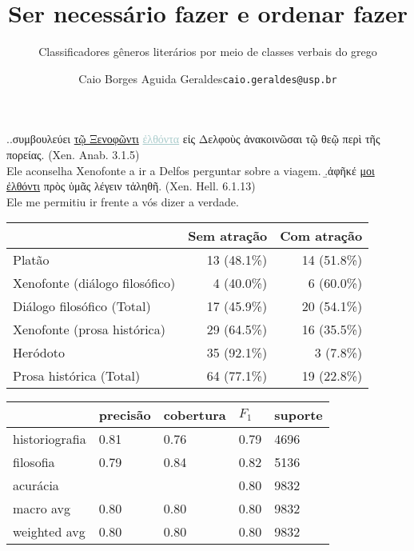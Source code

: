 \documentclass[10pt]{beamer}
\title{Ser necessário fazer e ordenar fazer}
\subtitle{Classificadores gêneros literários por meio de classes verbais do grego}
\author{Caio Borges Aguida Geraldes\newline \texttt{caio.geraldes@usp.br}\vspace{5pt}}
\institute{FFLCH-USP\\\texttt{[image: logo-fapesp.png]}}
\newcommand{\Vum}[1]{#1}
\newcommand{\Vdois}[1]{#1}
\newcommand{\Obl}[1]{\textcolor{obl}{\uline{#1}}}
\newcommand{\XAcu}[1]{\textcolor{acc}{\uline{#1}}}
\newcommand{\XObl}[1]{\textcolor{atr}{\uline{#1}}}
\begin{document}
\maketitle

\begin{frame}
	\ex.\a.\Vum{συμβουλεύει} \Obl{τῷ Ξενοφῶντι} \XAcu{ἐλθόντα} {εἰς Δελφοὺς} \Vdois{ἀνακοινῶσαι} {τῷ θεῷ} {περὶ τῆς πορείας}. (Xen. Anab. 3.1.5)\vspace{5pt}\\
	Ele aconselha Xenofonte a ir a Delfos perguntar sobre a viagem.\vspace{10pt}
	\b.ἀφῆκέ \Obl{μοι} \XObl{ἐλθόντι} πρὸς ὑμᾶς λέγειν τἀληθῆ. (Xen. Hell. 6.1.13)\vspace{5pt}\\
	Ele me permitiu ir frente a vós dizer a verdade.


\end{frame}

\begin{frame}
	\begin{table}[!h]
		\begin{center}
			\begin{tabular}[t]{lrr}
				\toprule
				                               & Sem atração  & Com atração  \\
				\midrule
				Platão                         & 13 (48.1\%)  & 14 (51.8\%)  \\
				Xenofonte (diálogo filosófico) & 4   (40.0\%) & 6 (60.0\%)   \\
				\midrule
				Diálogo filosófico (Total)     & 17 (45.9\%)  & 20  (54.1\%) \\
				\midrule
				\midrule
				Xenofonte (prosa histórica)    & 29 (64.5\%)  & 16  (35.5\%) \\
				Heródoto                       & 35 (92.1\%)  & 3   (7.8\%)  \\
				\midrule
				Prosa histórica (Total)        & 64 (77.1\%)  & 19  (22.8\%) \\
				\bottomrule
			\end{tabular}
		\end{center}
	\end{table}
\end{frame}

\begin{frame}
	\begin{table}[!ht]
		\centering
		\begin{tabular}{lllll}
			\toprule
			{}             & precisão & cobertura & $F_1$ & suporte \\
			\midrule
			historiografia & 0.81     & 0.76      & 0.79  & 4696    \\
			filosofia      & 0.79     & 0.84      & 0.82  & 5136    \\
			\midrule
			acurácia       &          &           & 0.80  & 9832    \\
			macro avg      & 0.80     & 0.80      & 0.80  & 9832    \\
			weighted avg   & 0.80     & 0.80      & 0.80  & 9832    \\
			\bottomrule
		\end{tabular}
	\end{table}
\end{frame}
\end{document}
